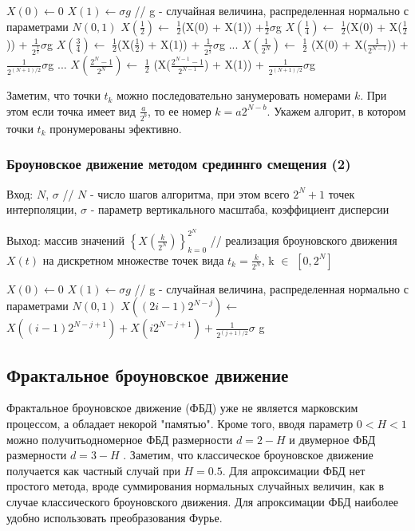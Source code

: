 \begin{algorithmic}[1]
	\State $X(0)\gets 0$
	\State $X(1)\gets \sigma g$ // g - случайная величина, распределенная нормально с параметрами $N(0,1)$
	\State $X(\frac{1}{2})\gets$ $\frac{1}{2}$(X(0) + X(1)) +$\frac{1}{2}$$\sigma$g
	\State $X(\frac{1}{4})\gets$ $\frac{1}{2}$(X(0) + X($\frac{1}{2}$)) + $\frac{1}{2^{\frac{3}{2}}}$$\sigma$g
	\State $X(\frac{3}{4})\gets$ $\frac{1}{2}$(X($\frac{1}{2}$) + X(1)) + $\frac{1}{2^{\frac{3}{2}}}$$\sigma$g
	\Statex
	...
	\State $X(\frac{1}{2^N})\gets$ $\frac{1}{2}$ (X(0) + X($\frac{1}{2^{N - 1}}$)) + $\frac{1}{2^{(N + 1) / 2}}$$\sigma$g
	\Statex
	...
	\State $X(\frac{2^N - 1}{2^N})\gets$  $\frac{1}{2}$ (X($\frac{2^{N - 1} - 1}{2^{N - 1}}$) + X(1)) + $\frac{1}{2^{(N + 1) / 2}}$$\sigma$g
\end{algorithmic}

Заметим, что точки $t_k$ можно последовательно занумеровать номерами $k$. При этом если точка имеет вид $\frac{a}{2^b}$, то ее номер $k = a2^{N-b}$. Укажем алгорит, в котором точки $t_k$ пронумерованы эфективно.

\subsubsection{Броуновское движение методом срединнго смещения (2)}

Вход: $N$, 	$\sigma$ // $N$ - число шагов алгоритма, при этом всего $2^N + 1$ точек интерполяции, $\sigma$ - параметр вертикального масштаба, коэффициент дисперсии

Выход: массив значений $\left\{X(\frac{k}{2^N})\right\}_{k=0}^{2^N}$ // реализация броуновского движения $X(t)$ на дискретном множестве точек вида $t_k = \frac{k}{2^N}$, k $\in$ $[0, 2^N]$

\begin{algorithmic}[1]
	\State $X(0)\gets 0$
	\State $X(1)\gets \sigma g$ // g - случайная величина, распределенная нормально с параметрами $N(0,1)$
	\State $X((2i - 1) 2^{N - j})$$\gets$ $X((i - 1)2^{N-j+1}) + X(i2^{N - j + 1}) + \frac{1}{2^{(j+1)/2}}$$\sigma$ g
	\EndFor
	\EndFor
\end{algorithmic}

\subsection{Фрактальное броуновское движение}

Фрактальное броуновское движение (ФБД) уже не является марковским процессом, а обладает некорой "памятью". Кроме того, вводя параметр $0 < H < 1$ можно получитьодномерное ФБД размерности $d = 2 - H$ и двумерное ФБД размерности $d = 3 - H$ .
Заметим, что классическое броуновское движение получается как частный случай при $H = 0.5$. Для апроксимации ФБД нет простого метода, вроде суммирования нормальных случайных величин, как в случае классического броуновского движения. Для апроксимации ФБД наиболее удобно использовать преобразования Фурье.


